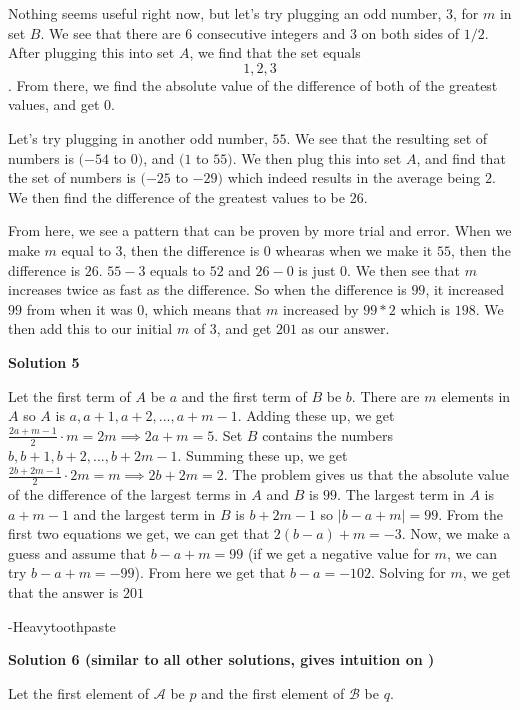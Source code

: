 \begin{enumerate}
 Nothing seems useful right now, but let's try plugging an odd number, $3$, for $m$ in set $B$. We see that there are $6$ consecutive integers and $3$ on both sides of $1/2$. After plugging this into set $A$, we find that the set equals 
 \[{1,2,3}\]. From there, we find the absolute value of the difference of both of the greatest values, and get 0. 

 Let's try plugging in another odd number, $55$. We see that the resulting set of numbers is $(-54$ to $0)$, and $(1$ to  $55)$. We then plug this into set $A$, and find that the set of numbers is $(-25$ to $-29)$ which indeed results in the average being $2$. We then find the difference of the greatest values to be 26. 

 From here, we see a pattern that can be proven by more trial and error. When we make $m$ equal to $3$, then the difference is $0$ whearas when we make it $55$, then the difference is $26$. $55-3$ equals to $52$ and $26-0$ is just $0$. We then see that $m$ increases twice as fast as the difference. So when the difference is $99$, it increased $99$ from when it was $0$, which means that $m$ increased by $99*2$ which is $198$. We then add this to our initial $m$ of $3$, and get $\boxed{201}$ as our answer.

 



\textbf{Solution 5}

Let the first term of $A$ be $a$ and the first term of $B$ be $b$. There are $m$ elements in $A$ so $A$ is $a, a+1, a+2,...,a+m-1$. Adding these up, we get $\frac{2a+m-1}{2}\cdot m = 2m \implies 2a+m=5$. Set $B$ contains the numbers $b, b+1, b+2,...,b+2m-1$. Summing these up, we get $\frac{2b+2m-1}{2}\cdot 2m =m \implies 2b+2m=2$. The problem gives us that the absolute value of the difference of the largest terms in $A$ and $B$ is $99$. The largest term in $A$ is $a+m-1$ and the largest term in $B$ is $b+2m-1$ so $|b-a+m|=99$. From the first two equations we get, we can get that $2(b-a)+m=-3$. Now, we make a guess and assume that $b-a+m=99$ (if we get a negative value for $m$, we can try $b-a+m=-99$). From here we get that $b-a=-102$. Solving for $m$, we get that the answer is $\boxed{201}$

 -Heavytoothpaste

 



\textbf{Solution 6 (similar to all other solutions, gives intuition on )}

Let the first element of $\mathcal{A}$ be $p$ and the first element of $\mathcal{B}$ be $q$. 


\end{enumerate}
